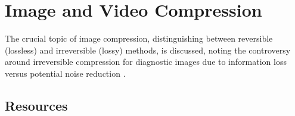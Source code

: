 \chapter{Image and Video Compression}

The crucial topic of image compression, distinguishing between
reversible (lossless) and irreversible (lossy) methods, is discussed,
noting the controversy around irreversible compression for diagnostic
images due to information loss versus potential noise reduction
\cite{bushberg2011essential}.

\section{Resources}


